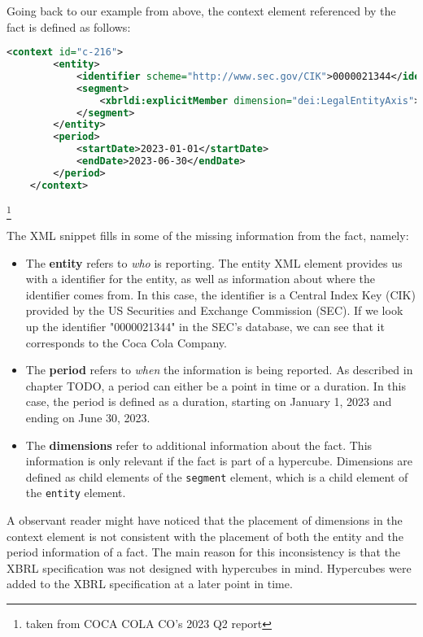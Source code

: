 Going back to our example from above, the context element referenced by the fact is defined as follows:

\begin{lstlisting}[language=XML]
    <context id="c-216">
        <entity>
            <identifier scheme="http://www.sec.gov/CIK">0000021344</identifier>
            <segment>
                <xbrldi:explicitMember dimension="dei:LegalEntityAxis">ko:BottlingOperationsInAfricaMember</xbrldi:explicitMember>
            </segment>
        </entity>
        <period>
            <startDate>2023-01-01</startDate>
            <endDate>2023-06-30</endDate>
        </period>
    </context>
\end{lstlisting}\footnote[2]{taken from COCA COLA CO's 2023 Q2 report}

The XML snippet fills in some of the missing information from the fact, namely:

\begin{itemize}
    \item The \textbf{entity} refers to \textit{who} is reporting. 
    The entity XML element provides us with a identifier for the entity, as well as information about where the identifier comes from.
    In this case, the identifier is a Central Index Key (CIK) provided by the US Securities and Exchange Commission (SEC).
    If we look up the identifier "0000021344" in the SEC's database, we can see that it corresponds to the Coca Cola Company.
    \item The \textbf{period} refers to \textit{when} the information is being reported.
    As described in chapter TODO, a period can either be a point in time or a duration.
    In this case, the period is defined as a duration, starting on January 1, 2023 and ending on June 30, 2023.
    \item The \textbf{dimensions} refer to additional information about the fact.
    This information is only relevant if the fact is part of a hypercube.
    Dimensions are defined as child elements of the \texttt{segment} element, 
    which is a child element of the \texttt{entity} element.
\end{itemize}

A observant reader might have noticed that the placement of dimensions in the context element is not consistent with the placement of both the entity and the period information of a fact.
The main reason for this inconsistency is that the XBRL specification was not designed with hypercubes in mind.
Hypercubes were added to the XBRL specification at a later point in time.

